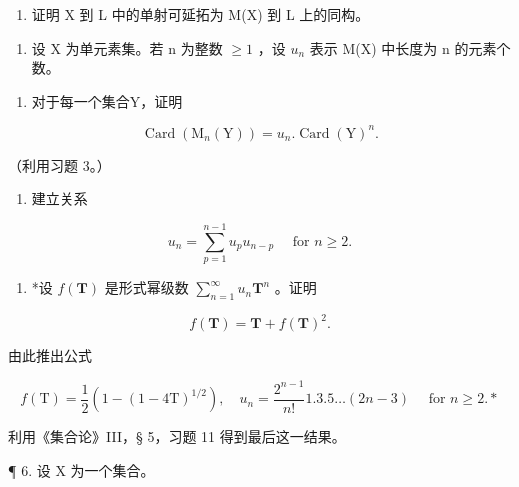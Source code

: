\begin{enumerate}
\def\labelenumi{(\alph{enumi})}
\setcounter{enumi}{1}
\tightlist
\item
  证明 X 到 L 中的单射可延拓为 M(X) 到 L 上的同构。
\end{enumerate}

\begin{enumerate}
\def\labelenumi{\arabic{enumi}.}
\setcounter{enumi}{4}
\tightlist
\item
  设 X 为单元素集。若 n 为整数 \(\geqslant1\) ，设 \(u_{n}\) 表示 M(X) 中长度为 n 的元素个数。
\end{enumerate}

\begin{enumerate}
\def\labelenumi{(\alph{enumi})}
\tightlist
\item
  对于每一个集合Y，证明
\end{enumerate}

\[
\operatorname{Card} \left(\mathrm{M} _ {n} (\mathrm{Y})\right) = u _ {n}. \operatorname{Card} (\mathrm{Y}) ^ {n}.
\]

（利用习题 3。）

\begin{enumerate}
\def\labelenumi{(\alph{enumi})}
\setcounter{enumi}{1}
\tightlist
\item
  建立关系
\end{enumerate}

\[
u _ {n} = \sum_ {p = 1} ^ {n - 1} u _ {p} u _ {n - p} \quad \text { for } n \geqslant 2.
\]

\begin{enumerate}
\def\labelenumi{(\alph{enumi})}
\setcounter{enumi}{2}
\tightlist
\item
  *设 \(f(\mathbf{T})\) 是形式幂级数 \(\sum_{n=1}^{\infty} u_n \mathbf{T}^n\) 。证明
\end{enumerate}

\[
f (\mathbf {T}) = \mathbf {T} + f (\mathbf {T}) ^ {2}.
\]

由此推出公式

\[
f (\mathrm{T}) = \frac {1}{2} (1 - (1 - 4 \mathrm{T}) ^ {1 / 2}), \quad u _ {n} = \frac {2 ^ {n - 1}}{n !} 1. 3. 5 \dots (2 n - 3) \quad \text { for } n \geqslant 2. *
\]

利用《集合论》III，§ 5，习题 11 得到最后这一结果。

¶ 6. 设 X 为一个集合。

